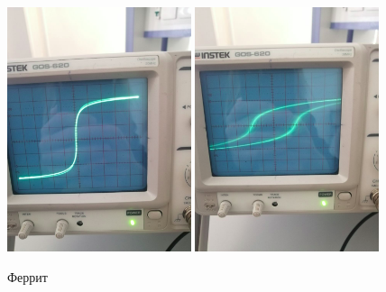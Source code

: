 \documentclass[14pt,a4paper]{article}
\begin{document}
\begin{figure}[H]
  \includegraphics*[width=0.48\textwidth]{2023-09-30-18-31-18.png}
  \includegraphics*[width=0.48\textwidth]{2023-09-30-18-31-37.png}
  \caption{Феррит}
\end{figure}
\end{document}
